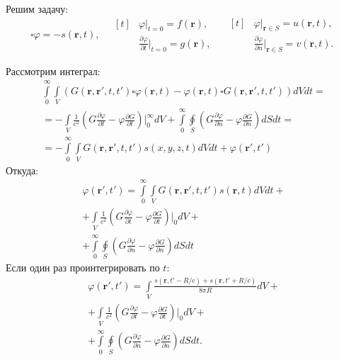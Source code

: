 \documentclass[a4paper,14pt]{extreport} %
\newcommand{\dff}[2]{\frac{\partial #1}{\partial #2}}
\renewcommand{\vec}[1]{\boldsymbol{#1}}
\begin{document}
	Решим задачу:
	\begin{equation*}
	\square \varphi = -s(\vec{r}, t),
	\quad
	\begin{aligned}[t]
		&\varphi\Big|_{t = 0} = f(\vec{r}),\\
		&\dff{\varphi}{t} \Big|_{t = 0} = g(\vec{r}),
	\end{aligned}
	\quad
	\begin{aligned}[t]
		&\varphi \Big|_{\vec{r}\in S} = u(\vec{r}, t), \\
		&\dff{\varphi}{n} \Big|_{\vec{r}\in S} = v(\vec{r}, t).
	\end{aligned}
	\end{equation*}
	
	Рассмотрим интеграл:
	\begin{gather*}
		\int\limits_0^{\infty}\int\limits_V \left(G(\vec{r}, \vec{r}', t, t') \square \varphi (\vec{r},t) - \varphi (\vec{r}, t) \square G(\vec{r}, \vec{r}', t, t') \right) dV dt =
		\\
		=
		-\int\limits_V\frac{1}{c^2} \left(G \dff{\varphi}{t} - \varphi \dff{G}{t} \right) \Bigg|_0^{\infty} dV +
		\int\limits_0^{\infty}\oint\limits_S \left(G \dff{\varphi}{n} - \varphi \dff{G}{n} \right) dS dt =
		\\
		=
		-\int\limits_0^{\infty}\int\limits_V G(\vec{r}, \vec{r}', t, t') s(x, y, z, t) dV dt
		+ \varphi(\vec{r}', t')
	\end{gather*}
	Откуда:
	\begin{equation*}
	\begin{gathered}
		\varphi(\vec{r}', t') = 
		\int\limits_0^{\infty}\int\limits_V G(\vec{r}, \vec{r}', t, t') s(\vec{r}, t) dV dt + \\
		+\int\limits_V\frac{1}{c^2} \left(G \dff{\varphi}{t} - \varphi \dff{G}{t} \right) \Bigg|_0 dV + \\ +
		\int\limits_0^{\infty}\oint\limits_S \left(G \dff{\varphi}{n} - \varphi \dff{G}{n} \right) dS dt	
	\end{gathered}
	\end{equation*}
	Если один раз проинтегрировать по $t$:
	\begin{gather*}
		\varphi(\vec{r}', t') = 
		\int\limits_V \frac{s(\vec{r}, t' - R/c) + s(\vec{r}, t' + R/c)}{8\pi R} dV + \\ +
		\int\limits_V\frac{1}{c^2} \left(G \dff{\varphi}{t} - \varphi \dff{G}{t} \right) \Bigg|_0 dV + \\ +
		\int\limits_0^{\infty}\oint\limits_S \left(G \dff{\varphi}{n} - \varphi \dff{G}{n} \right) dS dt.
	\end{gather*}
\end{document}

